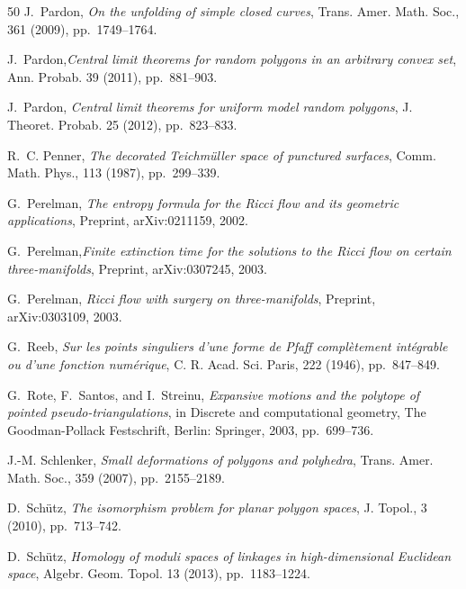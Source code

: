 \documentclass[11pt,letterpaper]{amsart}
\theoremstyle{plain}
\theoremstyle{definition}
\theoremstyle{remark}
\numberwithin{equation}{section}
\begin{document}
\begin{thebibliography}{50}
{\sc J.~Pardon}, {\em On the unfolding of simple closed curves}, Trans. Amer.
  Math. Soc., 361 (2009), pp.~1749--1764.

{\sc J.~Pardon},{\em Central limit theorems for random polygons in an arbitrary convex set}, Ann. Probab. 39 (2011), pp.~881--903.

{\sc J.~Pardon},
{\em Central limit theorems for uniform model random polygons},
J. Theoret. Probab. 25 (2012), pp.~823--833.


{\sc R.~C. Penner}, {\em The decorated {T}eichm\"uller space of punctured
  surfaces}, Comm. Math. Phys., 113 (1987), pp.~299--339.

{\sc G.~Perelman}, {\em The entropy formula for the {Ricci} flow and its
  geometric applications},
\newblock Preprint, {arXiv}:0211159, 2002.

{\sc G.~Perelman},{\em Finite extinction
  time for the solutions to the {Ricci} flow on certain three-manifolds},
\newblock Preprint, {arXiv}:0307245, 2003.

{\sc G.~Perelman}, {\em Ricci flow with
  surgery on three-manifolds},
\newblock Preprint, {arXiv}:0303109, 2003.

{\sc G.~Reeb}, {\em Sur les points singuliers d'une forme de {P}faff
  compl\`etement int\'egrable ou d'une fonction num\'erique}, C. R. Acad. Sci.
  Paris, 222 (1946), pp.~847--849.

{\sc G.~Rote, F.~Santos, and I.~Streinu}, {\em Expansive motions and the
  polytope of pointed pseudo-triangulations}, in Discrete and computational
  geometry, The Goodman-Pollack Festschrift, Berlin: Springer, 2003,
  pp.~699--736.

{\sc J.-M. Schlenker}, {\em Small deformations of polygons and polyhedra},
  Trans. Amer. Math. Soc., 359 (2007), pp.~2155--2189.

{\sc D.~Sch\"utz}, {\em The isomorphism problem for planar polygon spaces}, J.
  Topol., 3 (2010), pp.~713--742.

{\sc D.~Sch\"utz}, {\em Homology of moduli spaces of linkages in high-dimensional Euclidean space},
 Algebr. Geom. Topol. 13 (2013), pp.~1183--1224.


\end{thebibliography}
\end{document}
